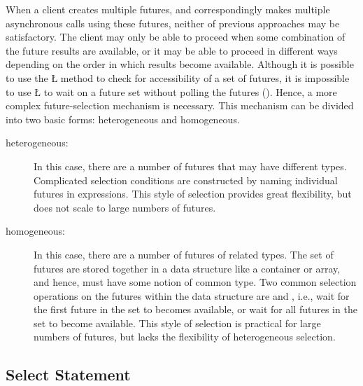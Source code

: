 \documentclass[openright,twoside]{report}
\begin{document}
When a client creates multiple futures, and correspondingly makes multiple asynchronous calls using these futures, neither of previous approaches may be satisfactory.
The client may only be able to proceed when some combination of the future results are available, or it may be able to proceed in different ways depending on the order in which results become available.
Although it is possible to use the \LGinlinetrue\LGbegin\lgrinde\L{}\endlgrinde\LGend{} method to check for accessibility of a set of futures, it is impossible to use \LGinlinetrue\LGbegin\lgrinde\L{}\endlgrinde\LGend{} to wait on a future set without polling the futures ().
Hence, a more complex future-selection mechanism is necessary.
This mechanism can be divided into two basic forms: heterogeneous and homogeneous.

\begin{description}
\item[heterogeneous:]
In this case, there are a number of futures that may have different types.
Complicated selection conditions are constructed by naming individual futures in expressions.
This style of selection provides great flexibility, but does not scale to large numbers of futures.
\item[homogeneous:]
In this case, there are a number of futures of related types.
The set of futures are stored together in a data structure like a container or array, and hence, must have some notion of common type.
Two common selection operations on the futures within the data structure are  and , i.e., wait for the first future in the set to becomes available, or wait for all futures in the set to become available.
This style of selection is practical for large numbers of futures, but lacks the flexibility of heterogeneous selection.
\end{description}


\subsection{Select Statement}
\label{s:SelectStatement}
\end{document}
